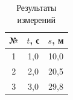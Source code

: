 \usepackage{booktabs}   %

\begin{table}[h]
  \centering
  \caption{Результаты измерений}
  \label{tab:measure}
  \begin{tabular}{ccc}
    \toprule
    № & $t$, с & $s$, м \\
    \midrule
    1 & 1{,}0 & 10{,}0 \\
    2 & 2{,}0 & 20{,}5 \\
    3 & 3{,}0 & 29{,}8 \\
    \bottomrule
  \end{tabular}
\end{table}
